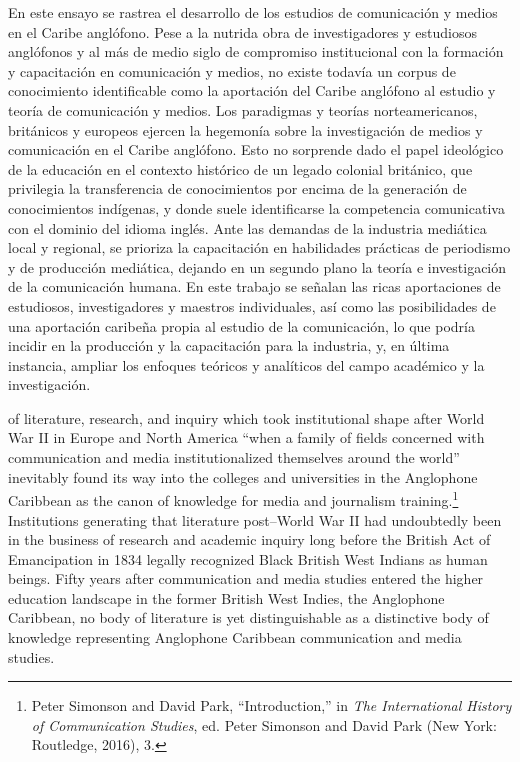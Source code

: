 \documentclass{tufte-handout}
\begin{document}
\begin{titlepage}
En este ensayo se rastrea el desarrollo de los estudios de comunicación y medios en el Caribe anglófono. Pese a la nutrida obra de investigadores y estudiosos anglófonos y al más de medio siglo de compromiso institucional con la formación y capacitación en comunicación y medios, no existe todavía un corpus de conocimiento identificable como la aportación del Caribe anglófono al estudio y teoría de comunicación y medios. Los paradigmas y teorías norteamericanos, británicos y europeos ejercen la hegemonía sobre la investigación de medios y comunicación en el Caribe anglófono. Esto no sorprende dado el papel ideológico de la educación en el contexto histórico de un legado colonial británico, que privilegia la transferencia de conocimientos por encima de la generación de conocimientos indígenas, y donde suele identificarse la competencia comunicativa con el dominio del idioma inglés. Ante las demandas de la industria mediática local y regional, se prioriza la capacitación en habilidades prácticas de periodismo y de producción mediática, dejando en un segundo plano la teoría e investigación de la comunicación humana. En este trabajo se señalan las ricas aportaciones de estudiosos, investigadores y maestros individuales, así como las posibilidades de una aportación caribeña propia al estudio de la comunicación, lo que podría incidir en la producción y la capacitación para la industria, y, en última instancia, ampliar los enfoques teóricos y analíticos del campo académico y la investigación.

\enlargethispage{2\baselineskip}


 \end{titlepage}


 of literature, research, and inquiry which took
institutional shape after World War II in Europe and North America
``when a family of fields concerned with communication and media
institutionalized themselves around the world'' inevitably found its way
into the colleges and universities in the Anglophone Caribbean as the
canon of knowledge for media and journalism training.\footnote{Peter
  Simonson and David Park, ``Introduction,'' in \emph{The International
  History of Communication Studies}, ed. Peter Simonson and David Park
  (New York: Routledge, 2016), 3.} Institutions generating that
literature post--World War II had undoubtedly been in the business of
research and academic inquiry long before the British Act of
Emancipation in 1834 legally recognized Black British West Indians as
human beings. Fifty years after communication and media studies entered
the higher education landscape in the former British West Indies, the
Anglophone Caribbean, no body of literature is yet distinguishable as a
distinctive body of knowledge representing Anglophone Caribbean
communication and media studies.
\end{document}

